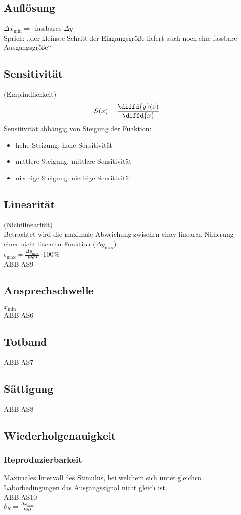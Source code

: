 \subsection{Auflösung}
$\Delta x_{\text{min}} \Rightarrow$ fassbares $\Delta y$\\
Sprich: „der kleinste Schritt der Eingangsgröße liefert auch noch eine fassbare Ausgangsgröße“

\subsection{Sensitivität} (Empfindlichkeit)
$$S(x)=\frac{\diffd{y}(x)}{\diffd{x}}$$
Sensitivität abhängig von Steigung der Funktion:
\begin{itemize}
\item hohe Steigung: hohe Sensitivität
\item mittlere Steigung: mittlere Sensitivität
\item niedrige Steigung: niedrige Sensitivität
\end{itemize}
\subsection{Linearität} (Nichtlinearität)\\
Betrachtet wird die maximale Abweichung zwischen einer linearen Näherung einer nicht-linearen Funktion ($\Delta y_{\text{max}}$).\\
$\epsilon_{\text{max}}=\frac{\Delta y_{\text{max}}}{FSO}\cdot 100 \%$\\
ABB AS9

\subsection{Ansprechschwelle}
$x_{\text{min}}$\\
ABB AS6
\subsection{Totband}
ABB AS7
\subsection{Sättigung}
ABB AS8

\subsection{Wiederholgenauigkeit}
\subsubsection{Reproduzierbarkeit}
Maximales Intervall des Stimulus, bei welchem sich unter gleichen Laborbedingungen das Ausgangssignal nicht gleich ist.\\
ABB AS10\\
$\delta_R = \frac{\Delta x_{\text{max}}}{FSI}$

